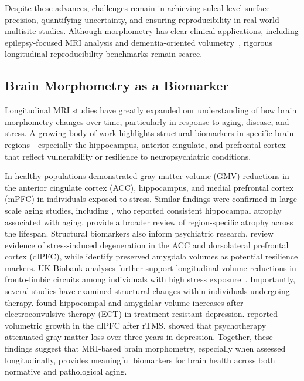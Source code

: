 \documentclass{midl} %
\begin{document}
Despite these advances, challenges remain in achieving sulcal-level surface precision, quantifying uncertainty, and ensuring reproducibility in real-world multisite studies. Although morphometry has clear clinical applications, including epilepsy-focused MRI analysis and dementia-oriented volumetry~\citep{Aliev2021FCD,Khadhraoui2024}, rigorous longitudinal reproducibility benchmarks remain scarce.

\subsection{Brain Morphometry as a Biomarker}

Longitudinal MRI studies have greatly expanded our understanding of how brain morphometry changes over time, particularly in response to aging, disease, and stress. A growing body of work highlights structural biomarkers in specific brain regions---especially the hippocampus, anterior cingulate, and prefrontal cortex---that reflect vulnerability or resilience to neuropsychiatric conditions.

In healthy populations \cite{papagni2011stress} demonstrated gray matter volume (GMV) reductions in the anterior cingulate cortex (ACC), hippocampus, and medial prefrontal cortex (mPFC) in individuals exposed to stress. Similar findings were confirmed in large-scale aging studies, including \cite{schaefer2018longitudinal}, who reported consistent hippocampal atrophy associated with aging. \citet{macdonald2021mri} provide a broader review of region-specific atrophy across the lifespan. Structural biomarkers also inform psychiatric research. \citet{cardoner2024impact} review evidence of stress-induced degeneration in the ACC and dorsolateral prefrontal cortex (dlPFC), while \citet{carnevali2018resilience} identify preserved amygdala volumes as potential resilience markers. UK Biobank analyses further support longitudinal volume reductions in fronto-limbic circuits among individuals with high stress exposure~\citep{statsenko2022brain}. Importantly, several studies have examined structural changes within individuals undergoing therapy. \citet{gryglewski2019ect} found hippocampal and amygdalar volume increases after electroconvulsive therapy (ECT) in treatment-resistant depression. \citet{furtado2012tms} reported volumetric growth in the dlPFC after rTMS. \citet{frodl2008gmd} showed that psychotherapy attenuated gray matter loss over three years in depression. Together, these findings suggest that MRI-based brain morphometry, especially when assessed longitudinally, provides meaningful biomarkers for brain health across both normative and pathological aging.
\end{document}
